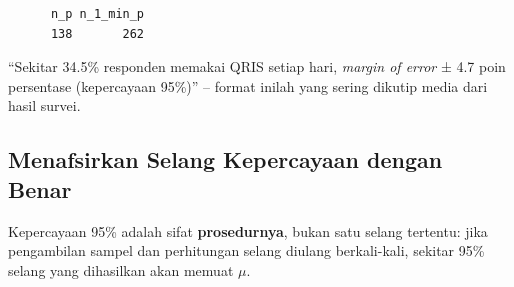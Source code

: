 \documentclass[
  indonesian,
  letterpaper,
]{book}
\begin{document}
\begin{verbatim}
      n_p n_1_min_p 
      138       262 
\end{verbatim}

``Sekitar 34.5\% responden memakai QRIS setiap hari, \emph{margin of
error} ± 4.7 poin persentase (kepercayaan 95\%)'' -- format inilah yang
sering dikutip media dari hasil survei.

\subsection{Menafsirkan Selang Kepercayaan dengan
Benar}\label{menafsirkan-selang-kepercayaan-dengan-benar}

Kepercayaan 95\% adalah sifat \textbf{prosedurnya}, bukan satu selang
tertentu: jika pengambilan sampel dan perhitungan selang diulang
berkali-kali, sekitar 95\% selang yang dihasilkan akan memuat \(\mu\).
\end{document}
